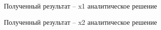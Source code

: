 \documentclass[12pt]{article}
\begin{document}
\begin{figure}[h]
	\caption{Полученный результат -- x1 аналитическое решение}
\end{figure}
\begin{figure}[h]
	\caption{Полученный результат -- x2 аналитическое решение}
\end{figure}
\end{document}
